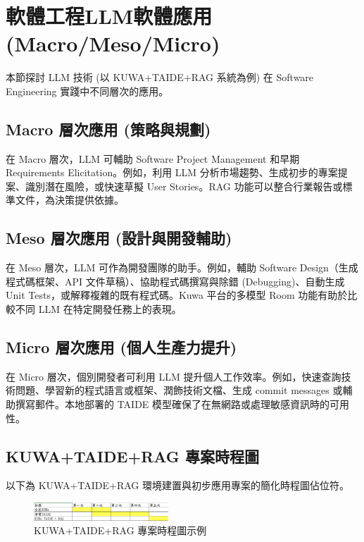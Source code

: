 \documentclass[twocolumn,11pt,a4paper]{article}
\begin{document}
\FloatBarrier

\section{軟體工程LLM軟體應用(Macro/Meso/Micro)}
本節探討 LLM 技術 (以 KUWA+TAIDE+RAG 系統為例) 在 Software Engineering 實踐中不同層次的應用。

\subsection{Macro 層次應用 (策略與規劃)}
在 Macro 層次，LLM 可輔助 Software Project Management 和早期 Requirements Elicitation。例如，利用 LLM 分析市場趨勢、生成初步的專案提案、識別潛在風險，或快速草擬 User Stories。RAG 功能可以整合行業報告或標準文件，為決策提供依據。

\subsection{Meso 層次應用 (設計與開發輔助)}
在 Meso 層次，LLM 可作為開發團隊的助手。例如，輔助 Software Design（生成程式碼框架、API 文件草稿）、協助程式碼撰寫與除錯 (Debugging)、自動生成 Unit Tests，或解釋複雜的既有程式碼。Kuwa 平台的多模型 Room 功能有助於比較不同 LLM 在特定開發任務上的表現。

\subsection{Micro 層次應用 (個人生產力提升)}
在 Micro 層次，個別開發者可利用 LLM 提升個人工作效率。例如，快速查詢技術問題、學習新的程式語言或框架、潤飾技術文檔、生成 commit messages 或輔助撰寫郵件。本地部署的 TAIDE 模型確保了在無網路或處理敏感資訊時的可用性。

\subsection{KUWA+TAIDE+RAG 專案時程圖}
以下為 KUWA+TAIDE+RAG 環境建置與初步應用專案的簡化時程圖佔位符。
\begin{figure}[htbp]
    \centering
    \includegraphics[width=0.45\textwidth]{res/image/kuwa_timeline.png} %
    \caption{KUWA+TAIDE+RAG 專案時程圖示例}
    \label{fig:kuwa_schedule}
\end{figure}
\FloatBarrier
\end{document}

